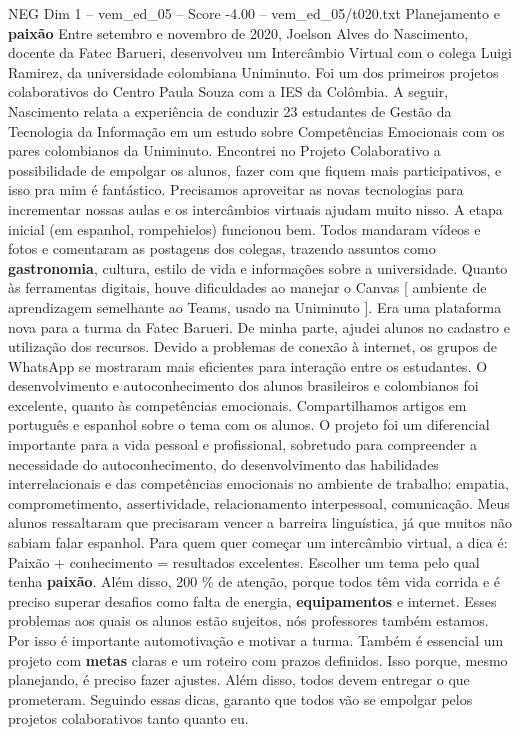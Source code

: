 \begin{textsample}{NEG Dim 1 – vem\_ed\_05 – Score -4.00 – vem\_ed\_05/t020.txt}  \label{ex:f1_neg_001}
Planejamento e \textbf{paixão} Entre setembro e novembro de 2020, Joelson Alves do Nascimento, docente da Fatec Barueri, desenvolveu um Intercâmbio Virtual com o colega Luigi Ramirez, da universidade colombiana Uniminuto.
Foi um dos primeiros projetos colaborativos do Centro Paula Souza com a IES da Colômbia.
A seguir, Nascimento relata a experiência de conduzir 23 estudantes de Gestão da Tecnologia da Informação em um estudo sobre Competências Emocionais com os pares colombianos da Uniminuto.
Encontrei no Projeto Colaborativo a possibilidade de empolgar os alunos, fazer com que fiquem mais participativos, e isso pra mim é fantástico.
Precisamos aproveitar as novas tecnologias para incrementar nossas aulas e os intercâmbios virtuais ajudam muito nisso.
A etapa inicial (em espanhol, rompehielos) funcionou bem.
Todos mandaram vídeos e fotos e comentaram as postagens dos colegas, trazendo assuntos como \textbf{gastronomia}, cultura, estilo de vida e informações sobre a universidade.
Quanto às ferramentas digitais, houve dificuldades ao manejar o Canvas [ ambiente de aprendizagem semelhante ao Teams, usado na Uniminuto ].
Era uma plataforma nova para a turma da Fatec Barueri.
De minha parte, ajudei alunos no cadastro e utilização dos recursos.
Devido a problemas de conexão à internet, os grupos de WhatsApp se mostraram mais eficientes para interação entre os estudantes.
O desenvolvimento e autoconhecimento dos alunos brasileiros e colombianos foi excelente, quanto às competências emocionais.
Compartilhamos artigos em português e espanhol sobre o tema com os alunos.
O projeto foi um diferencial importante para a vida pessoal e profissional, sobretudo para compreender a necessidade do autoconhecimento, do desenvolvimento das habilidades interrelacionais e das competências emocionais no ambiente de trabalho: empatia, comprometimento, assertividade, relacionamento interpessoal, comunicação.
Meus alunos ressaltaram que precisaram vencer a barreira linguística, já que muitos não sabiam falar espanhol.
Para quem quer começar um intercâmbio virtual, a dica é: Paixão + conhecimento = resultados excelentes.
Escolher um tema pelo qual tenha \textbf{paixão}.
Além disso, 200 \% de atenção, porque todos têm vida corrida e é preciso superar desafios como falta de energia, \textbf{equipamentos} e internet.
Esses problemas aos quais os alunos estão sujeitos, nós professores também estamos.
Por isso é importante automotivação e motivar a turma.
Também é essencial um projeto com \textbf{metas} claras e um roteiro com prazos definidos.
Isso porque, mesmo planejando, é preciso fazer ajustes.
Além disso, todos devem entregar o que prometeram.
Seguindo essas dicas, garanto que todos vão se empolgar pelos projetos colaborativos tanto quanto eu.

\end{textsample}
